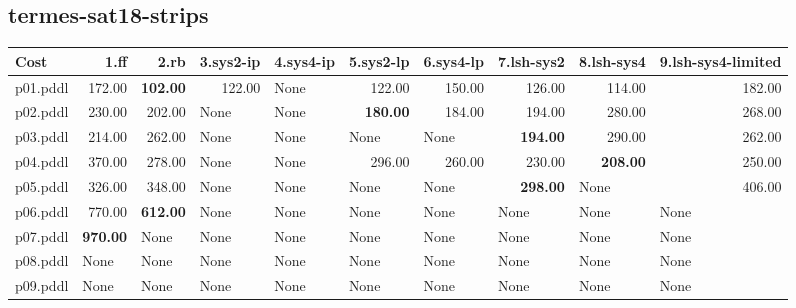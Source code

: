 \documentclass{article}
\begin{document}
\hypertarget{cost-termes-sat18-strips}{}
\subsection*{termes-sat18-strips}

\begin{tabular}{@{}lrrrrrrrrr@{}}
Cost & 1.ff & 2.rb & 3.sys2-ip & 4.sys4-ip & 5.sys2-lp & 6.sys4-lp & 7.lsh-sys2 & 8.lsh-sys4 & 9.lsh-sys4-limited \\
\midrule
p01.pddl & 172.00 & \textbf{102.00} & 122.00 & \multicolumn{1}{|l|}{None} & 122.00 & 150.00 & 126.00 & 114.00 & 182.00 \\
p02.pddl & 230.00 & 202.00 & \multicolumn{1}{|l|}{None} & \multicolumn{1}{|l|}{None} & \textbf{180.00} & 184.00 & 194.00 & 280.00 & 268.00 \\
p03.pddl & 214.00 & 262.00 & \multicolumn{1}{|l|}{None} & \multicolumn{1}{|l|}{None} & \multicolumn{1}{|l|}{None} & \multicolumn{1}{|l|}{None} & \textbf{194.00} & 290.00 & 262.00 \\
p04.pddl & 370.00 & 278.00 & \multicolumn{1}{|l|}{None} & \multicolumn{1}{|l|}{None} & 296.00 & 260.00 & 230.00 & \textbf{208.00} & 250.00 \\
p05.pddl & 326.00 & 348.00 & \multicolumn{1}{|l|}{None} & \multicolumn{1}{|l|}{None} & \multicolumn{1}{|l|}{None} & \multicolumn{1}{|l|}{None} & \textbf{298.00} & \multicolumn{1}{|l|}{None} & 406.00 \\
p06.pddl & 770.00 & \textbf{612.00} & \multicolumn{1}{|l|}{None} & \multicolumn{1}{|l|}{None} & \multicolumn{1}{|l|}{None} & \multicolumn{1}{|l|}{None} & \multicolumn{1}{|l|}{None} & \multicolumn{1}{|l|}{None} & \multicolumn{1}{|l|}{None} \\
p07.pddl & \textbf{970.00} & \multicolumn{1}{|l|}{None} & \multicolumn{1}{|l|}{None} & \multicolumn{1}{|l|}{None} & \multicolumn{1}{|l|}{None} & \multicolumn{1}{|l|}{None} & \multicolumn{1}{|l|}{None} & \multicolumn{1}{|l|}{None} & \multicolumn{1}{|l|}{None} \\
p08.pddl & \multicolumn{1}{|l|}{None} & \multicolumn{1}{|l|}{None} & \multicolumn{1}{|l|}{None} & \multicolumn{1}{|l|}{None} & \multicolumn{1}{|l|}{None} & \multicolumn{1}{|l|}{None} & \multicolumn{1}{|l|}{None} & \multicolumn{1}{|l|}{None} & \multicolumn{1}{|l|}{None} \\
p09.pddl & \multicolumn{1}{|l|}{None} & \multicolumn{1}{|l|}{None} & \multicolumn{1}{|l|}{None} & \multicolumn{1}{|l|}{None} & \multicolumn{1}{|l|}{None} & \multicolumn{1}{|l|}{None} & \multicolumn{1}{|l|}{None} & \multicolumn{1}{|l|}{None} & \multicolumn{1}{|l|}{None} \\

\end{tabular}
\end{document}
